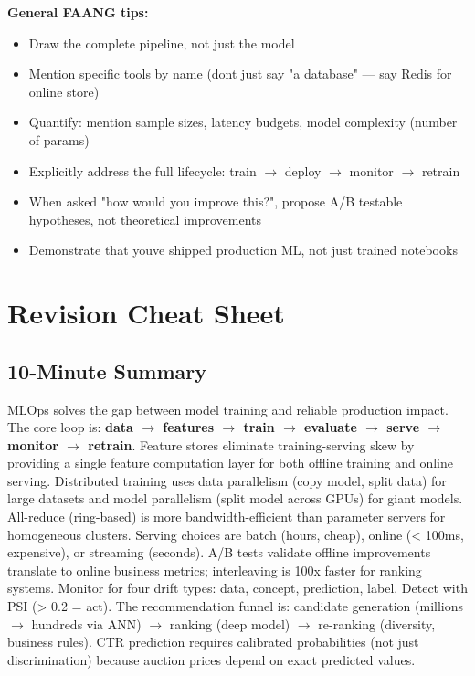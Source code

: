 \documentclass[11pt]{article}
\providecommand{\tightlist}{\setlength{\itemsep}{1pt}\setlength{\parskip}{0pt}}
\begin{document}
\textbf{General FAANG tips:}

\begin{itemize}
\tightlist
\item
  Draw the complete pipeline, not just the model
\item
  Mention specific tools by name (don\textquotesingle t just say "a database" --- say Redis for online store)
\item
  Quantify: mention sample sizes, latency budgets, model complexity (number of params)
\item
  Explicitly address the full lifecycle: train \(\rightarrow\) deploy \(\rightarrow\) monitor \(\rightarrow\) retrain
\item
  When asked "how would you improve this?", propose A/B testable hypotheses, not theoretical improvements
\item
  Demonstrate that you\textquotesingle ve shipped production ML, not just trained notebooks
\end{itemize}

\section{Revision Cheat Sheet}\label{revision-cheat-sheet}

\subsection{10-Minute Summary}\label{10-minute-summary}

MLOps solves the gap between model training and reliable production impact. The core loop is: \textbf{data \(\rightarrow\) features \(\rightarrow\) train \(\rightarrow\) evaluate \(\rightarrow\) serve \(\rightarrow\) monitor \(\rightarrow\) retrain}. Feature stores eliminate training-serving skew by providing a single feature computation layer for both offline training and online serving. Distributed training uses data parallelism (copy model, split data) for large datasets and model parallelism (split model across GPUs) for giant models. All-reduce (ring-based) is more bandwidth-efficient than parameter servers for homogeneous clusters. Serving choices are batch (hours, cheap), online (\textless{} 100ms, expensive), or streaming (seconds). A/B tests validate offline improvements translate to online business metrics; interleaving is 100x faster for ranking systems. Monitor for four drift types: data, concept, prediction, label. Detect with PSI (\textgreater{} 0.2 = act). The recommendation funnel is: candidate generation (millions \(\rightarrow\) hundreds via ANN) \(\rightarrow\) ranking (deep model) \(\rightarrow\) re-ranking (diversity, business rules). CTR prediction requires calibrated probabilities (not just discrimination) because auction prices depend on exact predicted values.
\end{document}
